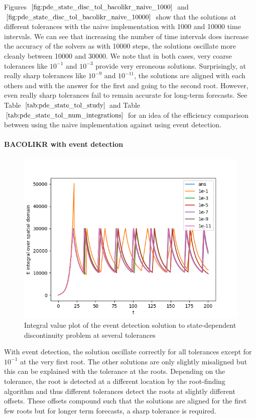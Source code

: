 \documentclass{article}
\begin{document}
Figures $\ref{fig:pde_state_disc_tol_bacolikr_naive_1000}$ and $\ref{fig:pde_state_disc_tol_bacolikr_naive_10000}$ show that the solutions at different tolerances with the naive implementation with 1000 and 10000 time intervals. We can see that increasing the number of time intervals does increase the accuracy of the solvers as with 10000 steps, the solutions oscillate more cleanly between 10000 and 30000. We note that in both cases, very coarse tolerances like $10^{-1}$ and $10^{-3}$ provide very erroneous solutions. Surprisingly, at really sharp tolerances like $10^{-9}$ and $10^{-11}$, the solutions are aligned with each others and with the answer for the first and going to the second root. However, even really sharp tolerances fail to remain accurate for long-term forecasts. See Table $\ref{tab:pde_state_tol_study}$ and Table $\ref{tab:pde_state_tol_num_integrations}$ for an idea of the efficiency comparison between using the naive implementation against using event detection.

\paragraph{BACOLIKR with event detection}
\begin{figure}[H]
\centering
\includegraphics[width=0.7\linewidth]{./figures/pde_state_disc_tol_event}
\caption{Integral value plot of the event detection solution to state-dependent discontinuity problem at several tolerances}
\label{fig:pde_state_disc_tol_event}
\end{figure}

With event detection, the solution oscillate correctly for all tolerances except for $10^{-1}$ at the very first root. The other solutions are only slightly misaligned but this can be explained with the tolerance at the roots. Depending on the tolerance, the root is detected at a different location by the root-finding algorithm and thus different tolerances  detect the roots at slightly different offsets. These offsets compound such that the solutions are aligned for the first few roots but for longer term forecasts, a sharp tolerance is required. 
\end{document}
